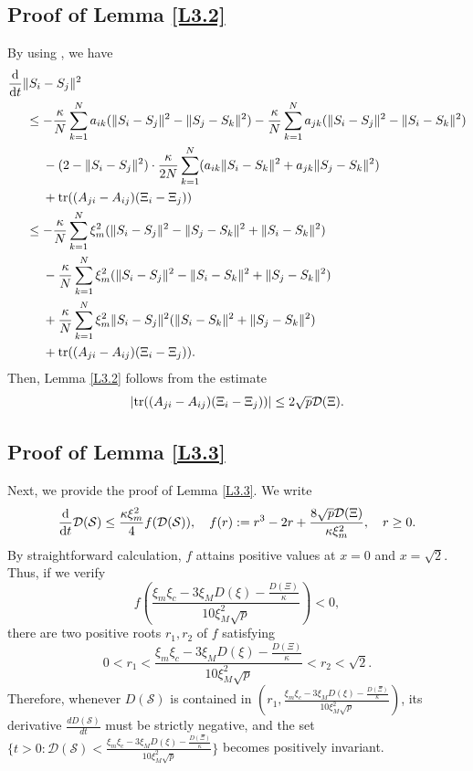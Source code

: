 \documentclass[11pt,reqno]{amsart}
\numberwithin{figure}{section}
\newcommand{\kp}{\kappa}
\newcommand{\dd}{  {\textup{d}} }
\newcommand{\dt} {    {  \textup{d}t   }    }
\begin{document}
\subsection{Proof of Lemma \ref{L3.2}}
By using \cite[Lemma 3.3]{HKK21}, we have
\begin{align} \label{C-0-3}
\begin{aligned}
&\frac{\dd}{\dd t} \|S_i - S_j\|^2 \\
&\hspace{0.5cm} \leq -\frac{\kp}{N} \sum_{k=1}^N a_{ik} ( \|S_i - S_j\|^2 - \|S_j - S_k\|^2) - \frac\kp N \sum_{k=1}^N a_{jk}( \|S_i- S_j\|^2 - \|S_i - S_k\|^2) \\
& \hspace{0.96cm}-( 2- \|S_ i- S_j\|^2) \cdot \frac{\kp}{2N } \sum_{k=1}^N( a_{ik} \|S_ i- S_k\|^2 + a_{jk} \|S_j - S_k\|^2)\\
& \hspace{0.96cm} + \textup{tr}(( A_{ji} - A_{ij})(\Xi_i -\Xi_j))\\
&\hspace{0.5cm}\leq  -\frac{\kp}{N} \sum_{k=1}^N \xi_m^2 ( \|S_i - S_j\|^2 - \|S_j - S_k\|^2+\|S_i-S_k\|^2)\\
&\hspace{0.96cm} - \frac\kp N \sum_{k=1}^N \xi_m^2( \|S_i- S_j\|^2 - \|S_i - S_k\|^2+ \|S_j - S_k\|^2)\\
&\hspace{0.96cm} +\frac{\kappa}{N}\sum_{k=1}^N\xi_m^2\|S_i-S_j\|^2( \|S_ i- S_k\|^2 +  \|S_j - S_k\|^2)\\
& \hspace{0.96cm} + \textup{tr}(( A_{ji} - A_{ij})(\Xi_i -\Xi_j)).
\end{aligned}
\end{align}
Then, Lemma \ref{L3.2} follows from the estimate
\[
|\textup{tr}(( A_{ji} - A_{ij})(\Xi_i -\Xi_j))| \leq 2\sqrt p \mathcal D(\Xi).
\]
 

\subsection{Proof of Lemma \ref{L3.3}}

Next, we provide the proof of Lemma \ref{L3.3}. We write
\[
\frac\dd\dt \mathcal D(\mathcal S) \leq \frac{\kp\xi_m^2}{4} f(\mathcal D(\mathcal S)), \quad f(r) := r^3 - 2r + \frac{8\sqrt p \mathcal D(\Xi)}{\kp \xi_m^2},\quad r\geq 0.
\]
By straightforward calculation, $f$ attains positive values at $x=0$ and $x=\sqrt{2}$.  Thus, if we verify 
\begin{equation}\label{A.10}
	f\left(\frac{\xi_m\xi_c-3\xi_MD(\xi)-\frac{D(\Xi)}{\kappa}}{10 \xi_M^2 \sqrt p}\right) <0,
\end{equation}
there are two positive roots $r_1,r_2$ of $f$ satisfying 
\[0<r_1<\frac{\xi_m\xi_c-3\xi_MD(\xi)-\frac{D(\Xi)}{\kappa}}{10 \xi_M^2 \sqrt p}<r_2<\sqrt{2}.\]
Therefore, whenever $D(\mathcal S)$ is contained in $(r_1,\frac{\xi_m\xi_c-3\xi_MD(\xi)-\frac{D(\Xi)}{\kappa}}{10 \xi_M^2 \sqrt p})$, its derivative $\frac{dD(\mathcal S)}{dt}$ must be strictly negative, and the set $\{ t>0:\mathcal D(\mathcal S) < \frac{\xi_m\xi_c-3\xi_MD(\xi)-\frac{D(\Xi)}{\kappa}}{10 \xi_M^2 \sqrt p}\}$ becomes positively invariant.\\
\end{document}
